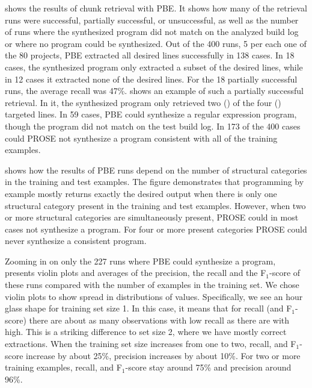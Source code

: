  shows the results of chunk
retrieval with PBE.
It shows how many of the retrieval runs were successful,
partially successful, or unsuccessful,
as well as the number of runs where the
synthesized program did not match on the analyzed build log or where
no program could be synthesized.
Out of the 400 runs, 5 per each one of the 80 projects,
PBE extracted all desired lines successfully in 138 cases.
In 18 cases, the synthesized program only extracted a
subset of the desired lines, while in 12 cases it extracted none of
the desired lines.
For the 18 partially successful runs, the average recall
was 47\%.
 shows an example of such
a partially successful retrieval.
In it, the synthesized program only
retrieved two ()
of the four () targeted lines.
In 59 cases, PBE could synthesize a regular expression program, though
the program did not match on the test build log.
In 173 of the 400 cases
could PROSE not synthesize a program consistent with all of the training
examples.

 shows how
the results of PBE
runs depend on the number of structural categories in the training and
test examples.
The figure demonstrates that programming by example mostly
returns exactly the desired output when there is only one
structural category present in the training and test examples.
However, when
two or more structural categories are simultaneously present,
PROSE could in most cases not synthesize a program.
For four or more present
categories PROSE could never synthesize a consistent program.

Zooming in on only the 227 runs where PBE could synthesize a program,
presents violin plots and averages of the precision, the recall
and the F$_{1}$-score
of these runs compared with the number of examples in the training set.
We chose violin plots to show spread in distributions of values.
Specifically, we see an hour glass shape for training set size 1.
In this case, it means that for recall (and F$_1$-score) there are about
as many observations with low recall as there are with high.
This is a striking difference to set size 2, where we have mostly
correct extractions.
When the training set
size increases from one to two, recall, and F$_{1}$-score increase by
about 25\%, precision increases by about 10\%.
For two or more
training examples, recall, and F$_{1}$-score stay around 75\% and
precision around 96\%.

